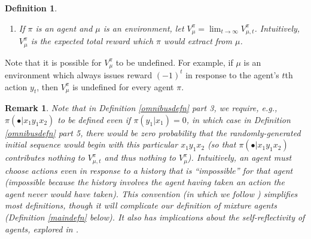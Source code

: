 \documentclass{article}
\newtheorem{definition}[theorem]{Definition}
\newtheorem{remark}[theorem]{Remark}
\begin{document}
\begin{definition}
\begin{enumerate}
        the rewards which would occur in the sequence
        $x_1y_1\ldots x_{t+1}y_{t+1}$
        randomly generated as follows:
        \begin{enumerate}
            \item $x_1\in \mathcal P$ is chosen randomly based
            on the probability measure $\mu(\bullet|\langle\rangle)$.
            \item $y_1\in\mathcal A$ is chosen randomly based on the probability
            measure $\pi(\bullet|x_1)$.
            \item
            For each $i>1$,
            $x_i\in\mathcal P$ is chosen randomly based on
            the probability measure
            $\mu(\bullet|x_1y_1\ldots x_{i-1}y_{i-1})$.
            \item
            For each $i>1$,
            $y_i\in\mathcal A$ is chosen randomly based on the probability measure
            $\pi(\bullet|x_1y_1\ldots x_{i-1}y_{i-1}x_i)$.
        \end{enumerate}
        \item
        If $\pi$ is an agent and $\mu$ is an environment,
        let $V^\pi_\mu=\lim_{t\to\infty}V^{\pi}_{\mu,t}$.
        Intuitively, $V^\pi_\mu$ is the expected total reward which $\pi$ would extract
        from $\mu$.
    \end{enumerate}
\end{definition}

Note that it is possible for $V^\pi_\mu$ to be undefined.
For example, if $\mu$ is an environment which always issues
reward $(-1)^t$ in response to the agent's $t$th action $y_t$,
then $V^\pi_\mu$ is undefined for every agent $\pi$.

\begin{remark}
\label{impossibleremark}
    Note that in Definition \ref{omnibusdefn} part 3, we require,
    e.g., $\pi(\bullet|x_1y_1x_2)$ to be defined even if
    $\pi(y_1|x_1)=0$, in which case in Definition \ref{omnibusdefn} part 5,
    there would be zero probability that the randomly-generated initial
    sequence would begin with this particular $x_1y_1x_2$
    (so that $\pi(\bullet|x_1y_1x_2)$ contributes nothing to
    $V^\pi_{\mu,t}$ and thus nothing to $V^\pi_\mu$).
    Intuitively, an agent must choose actions even in response to
    a history that is ``impossible'' for that agent (impossible because the history
    involves the agent having taken an action the agent never would have taken).
    This convention (in which we follow \cite{legg2007universal}) simplifies most
    definitions, though it will complicate our definition of mixture agents
    (Definition \ref{maindefn} below). It also has implications about the
    self-reflectivity of agents, explored in \cite{extendedenvironmentspaper}.
\end{remark}
\end{document}
